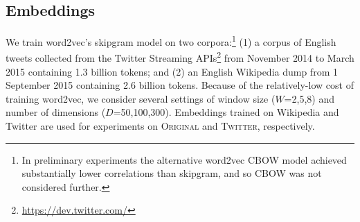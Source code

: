 \documentclass[11pt]{article}
\newcommand\original{\textsc{Original}\xspace}
\newcommand\twitter{\textsc{Twitter}\xspace}
\begin{document}




\subsection{Embeddings\label{sec:mm:embeddings}}

We train word2vec's skipgram model on two corpora:\footnote{In
  preliminary experiments the alternative word2vec CBOW model achieved
  substantially lower correlations than skipgram, and so CBOW was not
  considered further.} (1) a corpus of English tweets collected from
the Twitter Streaming APIs\footnote{\url{https://dev.twitter.com/}}
from November 2014 to March 2015 containing 1.3 billion tokens; and
(2) an English Wikipedia dump from 1 September 2015 containing 2.6
billion tokens. 
Because of the relatively-low cost of training word2vec, we consider
several settings of window size ($W$=2,5,8) and number of dimensions
($D$=50,100,300).  Embeddings trained on Wikipedia and Twitter are
used for experiments on \original and \twitter, respectively.
\end{document}
